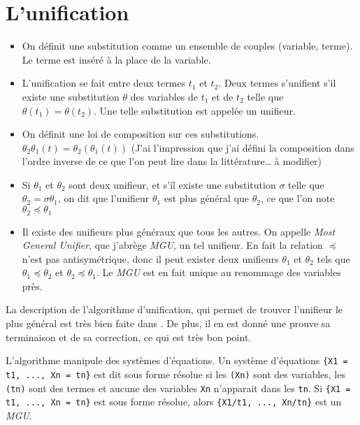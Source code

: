 \documentclass{article}
\begin{document}
\section{L'unification}

\begin{itemize}
  \item
    On définit une substitution comme un ensemble de couples (variable, terme). Le terme est inséré à la place de la variable.
  \item
    L'unification se fait entre deux termes $t_1$ et $t_2$. Deux termes s'unifient s'il existe une substitution $\theta$ des variables de $t_1$ et de $t_2$ telle que $\theta(t_1) = \theta(t_2)$. Une telle substitution est appelée un unifieur.
  \item
    On définit une loi de composition sur ces substitutions. $\theta_2\theta_1(t) = \theta_2(\theta_1(t))$ (J'ai l'impression que j'ai défini la composition dans l'ordre inverse de ce que l'on peut lire dans la littérature\ldots{} à modifier)
  \item
    Si $\theta_1$ et $\theta_2$ sont deux unifieur, et s'il existe une substitution $\sigma$ telle que $\theta_2 = \sigma\theta_1$, on dit que l'unifieur $\theta_1$ est plus général que $\theta_2$, ce que l'on note $\theta_2\preceq\theta_1$
  \item
    Il existe des unifieurs plus généraux que tous les autres. On appelle \emph{Most General Unifier}, que j'abrège \emph{MGU}, un tel unifieur. En fait la relation $\preceq$ n'est pas antisymétrique, donc il peut exister deux unifieurs $\theta_1$ et $\theta_2$ tels que $\theta_1\preceq\theta_2$ et $\theta_2\preceq\theta_1$. Le \emph{MGU} est en fait unique au renommage des variables près.
\end{itemize}

La description de l'algorithme d'unification, qui permet de trouver l'unifieur le plus général est très bien faite dans \cite{NilssonMaluszynski}. De plus, il en est donné une prouve sa terminaison et de sa correction, ce qui est très bon point.

L'algorithme manipule des systèmes d'équations. Un système d'équations \texttt{\{X1 = t1, ..., Xn = tn\}} est dit sous forme résolue si les \texttt{(Xn)} sont des variables, les \texttt{(tn)} sont des termes et aucune des variables \texttt{Xn} n'apparait dans les \texttt{tn}. Si \texttt{\{X1 = t1, ..., Xn = tn\}} est sous forme résolue, alors \texttt{\{X1/t1, ..., Xn/tn\}} est un \emph{MGU}.
\end{document}
